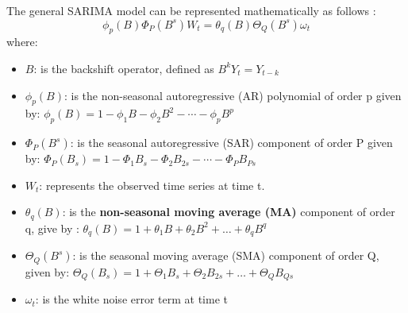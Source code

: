 The general SARIMA model can be represented mathematically as follows \cite{Lee2023}:
\begin{equation}
\phi_p(B)\Phi_P(B^s)W_t = \theta_q(B)\Theta_Q(B^s)\omega_t 
\end{equation} 
where: 
\begin{itemize}
    \item \( B \): is the backshift operator, defined as \( B^k Y_t = Y_{t-k} \) 
    \item \(\phi_p(B)\): is the non-seasonal autoregressive (AR) polynomial of order p given by: \(\phi_p(B) = 1 - \phi_1 B - \phi_2 B^2 - \cdots - \phi_p B^p\)
    \item \(\Phi_P(B^s)\): is the seasonal autoregressive (SAR) component of order P given by: \(\Phi_P(B_s) = 1 - \Phi_1 B_s - \Phi_2 B_{2s} - \cdots - \Phi_P B_{Ps}\) 
    \item \(W_t\): represents the observed time series at time t. 
    \item \(\theta_q(B)\): is the \textbf{non-seasonal moving average (MA)} component of order q, give by : \(\theta_q(B) = 1 + \theta_1 B + \theta_2 B^2 + \ldots + \theta_q B^q\)
    \item \(\Theta_Q(B^s)\): is the seasonal moving average (SMA) component of order Q, given by: \(\Theta_Q(B_s) = 1 + \Theta_1 B_s + \Theta_2 B_{2s} + \ldots + \Theta_Q B_{Qs}\)
    \item \(\omega_t\): is the white noise error term at time t
\end{itemize}

